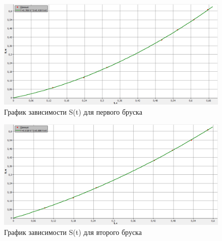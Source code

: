\documentclass[12pt]{article}
\begin{document}
	\begin{figure}[h!]
		\centering
		\includegraphics[width=1\linewidth]{graph1.png}
		\caption{График зависимости S(t) для первого бруска}
		\label{fig:graph1}
	\end{figure}
	\begin{figure}[h!]
		\centering
		\includegraphics[width=1\linewidth]{graph2.png}
		\caption{График зависимости S(t) для второго бруска}
		\label{fig:graph1}
	\end{figure}
\end{document}
